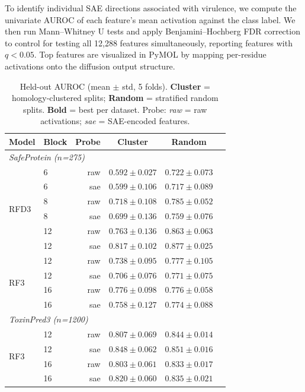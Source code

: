 \documentclass{article}
\begin{document}
To identify individual SAE directions associated with virulence, we compute the univariate AUROC of each feature's mean activation against the class label. We then run Mann--Whitney U tests \cite{mann1947whitney} and apply Benjamini--Hochberg FDR correction \cite{benjamini1995controlling} to control for testing all 12{,}288 features simultaneously, reporting features with $q < 0.05$. Top features are visualized in PyMOL by mapping per-residue activations onto the diffusion output structure.



\begin{table}[tb]
  \caption{Held-out AUROC (mean $\pm$ std, 5 folds). \textbf{Cluster} = homology-clustered splits; \textbf{Random} = stratified random splits. \textbf{Bold} = best per dataset. Probe: \textit{raw} = raw activations; \textit{sae} = SAE-encoded features.}
  \label{tab:probes}
  \centering
  \begin{small}
    \begin{tabular}{llrccc}
      \toprule
      Model & Block & Probe & Cluster & Random \\
      \midrule
      \multicolumn{5}{l}{\textit{SafeProtein ($n$=275)}} \\
      \cmidrule(lr){1-5}
      \multirow{6}{*}{RFD3}
        & 6  & raw & $0.592 \pm 0.027$ & $0.722 \pm 0.073$ \\
        & 6  & sae & $0.599 \pm 0.106$ & $0.717 \pm 0.089$ \\
        & 8  & raw & $0.718 \pm 0.108$ & $0.785 \pm 0.052$ \\
        & 8  & sae & $0.699 \pm 0.136$ & $0.759 \pm 0.076$ \\
        & 12 & raw & $0.763 \pm 0.136$ & $0.863 \pm 0.063$ \\
        & 12 & sae & $\mathbf{0.817 \pm 0.102}$ & $\mathbf{0.877 \pm 0.025}$ \\
      \cmidrule(lr){1-5}
      \multirow{4}{*}{RF3}
        & 12 & raw & $0.738 \pm 0.095$ & $0.777 \pm 0.105$ \\
        & 12 & sae & $0.706 \pm 0.076$ & $0.771 \pm 0.075$ \\
        & 16 & raw & $\mathbf{0.776 \pm 0.098}$ & $\mathbf{0.776 \pm 0.058}$ \\
        & 16 & sae & $0.758 \pm 0.127$ & $0.774 \pm 0.088$ \\
      \midrule
      \multicolumn{5}{l}{\textit{ToxinPred3 ($n$=1200)}} \\
      \cmidrule(lr){1-5}
      \multirow{4}{*}{RF3}
        & 12 & raw & $0.807 \pm 0.069$ & $0.844 \pm 0.014$ \\
        & 12 & sae & $\mathbf{0.848 \pm 0.062}$ & $\mathbf{0.851 \pm 0.016}$ \\
        & 16 & raw & $0.803 \pm 0.061$ & $0.833 \pm 0.017$ \\
        & 16 & sae & $0.820 \pm 0.060$ & $0.835 \pm 0.021$ \\
      \bottomrule
    \end{tabular}
  \end{small}
  \vspace{-3ex}
\end{table}
\end{document}
